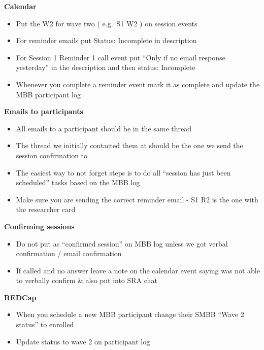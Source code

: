 \documentclass[]{book}
\providecommand{\tightlist}{%
  \setlength{\itemsep}{0pt}\setlength{\parskip}{0pt}}
\begin{document}
\textbf{Calendar}

\begin{itemize}
\tightlist
\item
  Put the W2 for wave two ( e.g.~S1 W2 ) on session events
\item
  For reminder emails put Status: Incomplete in description
\item
  For Session 1 Reminder 1 call event put ``Only if no email response yesterday'' in the description and then status: Incomplete
\item
  Whenever you complete a reminder event mark it as complete and update the MBB participant log
\end{itemize}

\textbf{Emails to participants}

\begin{itemize}
\tightlist
\item
  All emails to a participant should be in the same thread\\
\item
  The thread we initially contacted them at should be the one we send the session confirmation to\\
\item
  The easiest way to not forget steps is to do all ``session has just been scheduled'' tasks based on the MBB log\\
\item
  Make sure you are sending the correct reminder email - S1 R2 is the one with the researcher card
\end{itemize}

\textbf{Confirming sessions}

\begin{itemize}
\tightlist
\item
  Do not put as ``confirmed session'' on MBB log unless we got verbal confirmation / email confirmation
\item
  If called and no answer leave a note on the calendar event saying was not able to verbally confirm \& also put into SRA chat
\end{itemize}

\textbf{REDCap}

\begin{itemize}
\tightlist
\item
  When you schedule a new MBB participant change their SMBB ``Wave 2 status'' to enrolled\\
\item
  Update status to wave 2 on participant log
\end{itemize}
\end{document}
